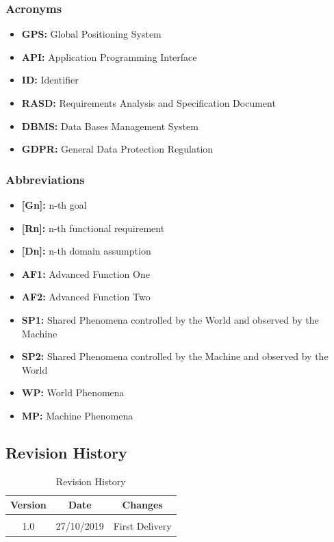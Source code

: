 \documentclass {article}
\begin{document}
		\subsubsection{Acronyms}
		
			\begin{itemize}
				\item {\bf GPS:} Global Positioning System
				\item {\bf API:} Application Programming Interface
				\item {\bf ID:} Identifier
				\item {\bf RASD:} Requirements Analysis and 								Specification Document
				\item {\bf DBMS:} Data Bases Management System
				\item {\bf GDPR:} General Data Protection Regulation
			\end{itemize}

				
				
		\subsubsection{Abbreviations}
		
			\begin{itemize}
				\item {\bf [Gn]:} n-th goal
				\item {\bf [Rn]:} n-th functional requirement
				\item {\bf [Dn]:} n-th domain assumption
				\item {\bf AF1:} Advanced Function One
				\item {\bf AF2:} Advanced Function Two
				\item {\bf SP1:} Shared Phenomena controlled by the 	World and observed by the Machine
				\item {\bf SP2:} Shared Phenomena controlled by the 	Machine and observed by the World
				\item {\bf WP:} World Phenomena
				\item {\bf MP:} Machine Phenomena
			\end{itemize}
			

	\subsection{Revision History}
	
	\begin{table}[ht]
		\centering
		\begin{tabular}{ccc} 
		Version & Date & Changes  \\ 
		\hline
		 \\1.0 & 27/10/2019 & First Delivery
		 \\
		\end{tabular}
		\caption{Revision History}
		\label{default}
	\end{table}
	
\end{document}
